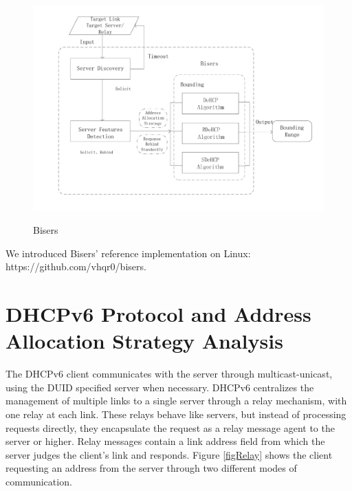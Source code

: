 \documentclass[conference]{IEEEtran}
\begin{document}
\begin{figure}[htbp]
  \caption{Bisers}
  \label{figBisers}
  \centering
  \includegraphics[scale=0.4]{bisers.pdf} \\
\end{figure}

We introduced Bisers' reference implementation on Linux:
https://github.com/vhqr0/bisers.

\section{DHCPv6 Protocol and Address Allocation Strategy Analysis}

The DHCPv6 client communicates with the server through
multicast-unicast, using the DUID specified server when
necessary. DHCPv6 centralizes the management of multiple links to a
single server through a relay mechanism, with one relay at each
link. These relays behave like servers, but instead of processing
requests directly, they encapsulate the request as a relay message
agent to the server or higher. Relay messages contain a link address
field from which the server judges the client's link and
responds. Figure \ref{figRelay} shows the client requesting an address
from the server through two different modes of communication.
\end{document}
